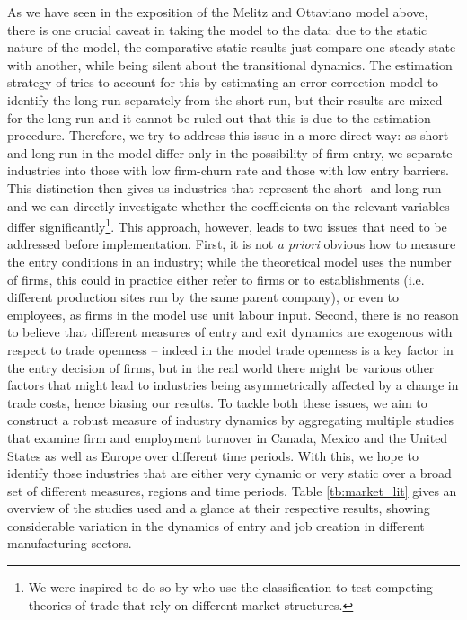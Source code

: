 As we have seen in the exposition of the Melitz and Ottaviano model above, there is one crucial caveat in taking the model to the data: due to the static nature of the model, the comparative static results just compare one steady state with another, while being silent about the transitional dynamics. The estimation strategy of \citet{Chen2009} tries to account for this by estimating an error correction model to identify the long-run separately from the short-run, but their results are mixed for the long run and it cannot be ruled out that this is due to the estimation procedure. Therefore, we try to address this issue in a more direct way: as short- and long-run in the model differ only in the possibility of firm entry, we separate industries into those with low firm-churn rate and those with low entry barriers. This distinction then gives us industries that represent the short- and long-run and we can directly investigate whether the coefficients on the relevant variables differ significantly\footnote{We were inspired to do so by \citet{Head1999} who use the classification to test competing theories of trade that rely on different market structures.}. This approach, however, leads to two issues that need to be addressed before implementation. First, it is not \textit{a priori} obvious how to measure the entry conditions in an industry; while the theoretical model uses the number of firms, this could in practice either refer to firms or to establishments (i.e. different production sites run by the same parent company), or even to employees, as firms in the model use unit labour input. Second, there is no reason to believe that different measures of entry and exit dynamics are exogenous with respect to trade openness -- indeed in the model trade openness is a key factor in the entry decision of firms, but in the real world there might be various other factors that might lead to industries being asymmetrically affected by a change in trade costs, hence biasing our results. To tackle both these issues, we aim to construct a robust measure of industry dynamics by aggregating multiple studies that examine firm and employment turnover in Canada, Mexico and the United States as well as Europe over different time periods. With this, we hope to identify those industries that are either very dynamic or very static over a broad set of different measures, regions and time periods. Table \ref{tb:market_lit} gives an overview of the studies used and a glance at their respective results, showing considerable variation in the dynamics of entry and job creation in different manufacturing sectors.
 
